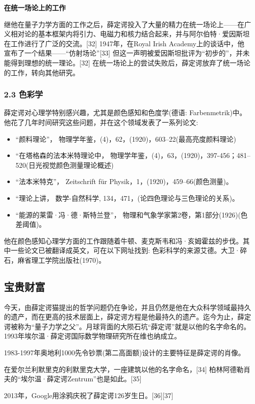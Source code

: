 \textbf{在统一场论上的工作}

继他在量子力学方面的工作之后，薛定谔投入了大量的精力在统一场论上——在广义相对论的基本框架内将引力、电磁力和核力结合起来，并与阿尔伯特·爱因斯坦在工作进行了广泛的交流。[32] 1947年，在Royal Irish Academy上的谈话中，他宣布了一个结果——“仿射场论”[33] 但这一声明被爱因斯坦批评为“初步的”，并未能得到理想的统一理论。[32] 在统一场论上的尝试失败后，薛定谔放弃了统一场论的工作，转向其他研究。

\subsubsection{2.3 色彩学}
薛定谔对心理学特别感兴趣，尤其是颜色感知和色度学(德语: Farbenmetrik)中。他花了几年时间研究这些问题，并在这个领域发表了一系列论文:
\begin{itemize}
\item “颜料理论”， 物理学年鉴，(4)，62，(1920)，603–22(最高亮度颜料理论)
\item “在塔格森的法本米特理论中， 物理学年鉴，(4)，63，(1920)，397-456；481–520(日光视觉颜色测量理论概述)
\item “法本米特克”， Zeitschrift für Physik，1，(1920)，459–66(颜色测量)。
\item “理论上讲， 数学-自然科学, 134，471，(论四色理论与三色理论的关系)。
\item “能源的莱雷·冯·德·斯特兰登”， 物理和气象学家第2卷，第1部分(1926)(色差阈值)。
\end{itemize}

他在颜色感知心理学方面的工作跟随着牛顿、麦克斯韦和冯·亥姆霍兹的步伐。其中一些论文已被翻译成英文，可在以下网址找到: 色彩科学的来源艾德。大卫·碎石，麻省理工学院出版社(1970)。

\subsection{宝贵财富}
今天，由薛定谔猫提出的哲学问题仍在争论，并且仍然是他在大众科学领域最持久的遗产，而在更高的技术层面上，薛定谔方程是他最持久的遗产。迄今为止，薛定谔被称为“量子力学之父”。月球背面的大陨石坑“薛定谔”就是以他的名字命名的。1993年埃尔温·薛定谔国际数学物理研究所在维也纳成立。

1983-1997年奥地利1000先令钞票(第二高面额)设计的主要特征是薛定谔的肖像。

在爱尔兰利默里克的利默里克大学，一座建筑以他的名字命名，[34] 柏林阿德勒肖夫的“埃尔温·薛定谔Zentrum”也是如此。[35]

2013年，Google用涂鸦庆祝了薛定谔126岁生日。[36][37]